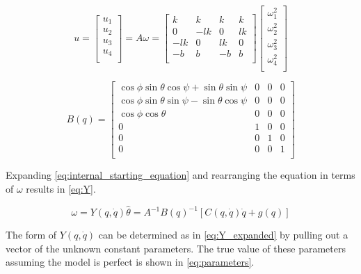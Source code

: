 \documentclass[letterpaper,12pt,titlepage,oneside,final]{book}
\begin{document}
\begin{equation} \label{eq:u}
u =
\begin{bmatrix}
u_{1} \\
u_{2} \\
u_{3} \\
u_{4} \\
\end{bmatrix}
=
A\omega
=
\begin{bmatrix}
k & k & k & k \\
0 & -lk & 0 & lk \\
-lk & 0 & lk & 0 \\
-b & b & -b & b \\
\end{bmatrix}
\begin{bmatrix}
\omega_{1}^{2} \\
\omega_{2}^{2} \\
\omega_{3}^{2} \\
\omega_{4}^{2} \\
\end{bmatrix}
\end{equation}

\begin{equation} \label{eq:b}
B(q) =
\begin{bmatrix}
\cos{\phi}\sin{\theta}\cos{\psi} + \sin{\theta}\sin{\psi} & 0 & 0 & 0 \\
\cos{\phi}\sin{\theta}\sin{\psi} - \sin{\theta}\cos{\psi} & 0 & 0 & 0 \\
\cos{\phi}\cos{\theta} & 0 & 0 & 0 \\
0 & 1 & 0 & 0 \\
0 & 0 & 1 & 0 \\
0 & 0 & 0 & 1 \\
\end{bmatrix}
\end{equation}

Expanding \eqref{eq:internal_starting_equation} and rearranging the equation in terms of $\omega$ results in \eqref{eq:Y}.

\begin{equation} \label{eq:Y} 
\omega = Y(q,\dot{q})\hat{\theta} = A^{-1}B(q)^{-1}[C(q,\dot{q})\dot{q} + g(q)]
\end{equation}

The form of $Y(q,\dot{q})$ can be determined as in \eqref{eq:Y_expanded} by pulling out a vector of the unknown constant parameters. The true value of these parameters assuming the model is perfect is shown in \eqref{eq:parameters}.
\end{document}
